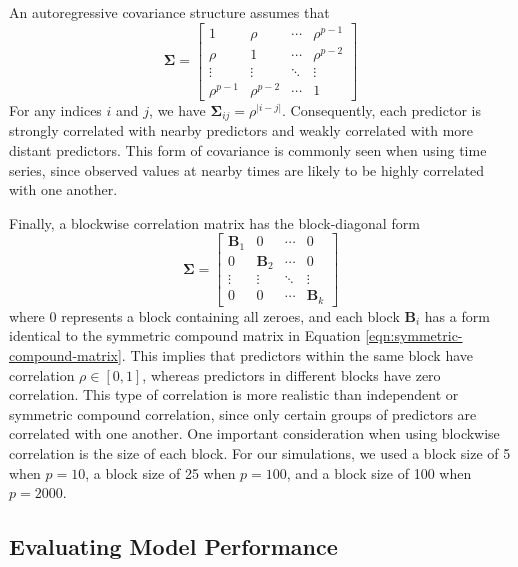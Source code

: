 \documentclass{article}
\begin{document}
	An autoregressive covariance structure assumes that
	\begin{equation}
		\mathbf{\Sigma} = \begin{bmatrix}
			1 & \rho & \cdots & \rho^{p - 1} \\
			\rho & 1 & \cdots & \rho^{p - 2} \\
			\vdots & \vdots & \ddots & \vdots \\
			\rho^{p - 1} & \rho^{p - 2} & \cdots & 1
		\end{bmatrix}
	\end{equation}
	For any indices $i$ and $j$, we have $\mathbf{\Sigma}_{ij} = \rho^{\vert i - j\vert}$. Consequently, each predictor is strongly correlated with nearby predictors and weakly correlated with more distant predictors. This form of covariance is commonly seen when using time series, since observed values at nearby times are likely to be highly correlated with one another. 
	
	Finally, a blockwise correlation matrix has the block-diagonal form
	\begin{equation}
		\mathbf{\Sigma} = \begin{bmatrix}
			\mathbf{B}_1 & 0 & \cdots & 0 \\
			0 & \mathbf{B}_2 & \cdots & 0 \\
			\vdots & \vdots & \ddots & \vdots \\
			0 & 0 & \cdots & \mathbf{B}_k
		\end{bmatrix}
	\end{equation}
	where $0$ represents a block containing all zeroes, and each block $\mathbf{B}_i$ has a form identical to the symmetric compound matrix in Equation \ref{eqn:symmetric-compound-matrix}. This implies that predictors within the same block have correlation $\rho\in [0, 1]$, whereas predictors in different blocks have zero correlation. This type of correlation is more realistic than independent or symmetric compound correlation, since only certain groups of predictors are correlated with one another. One important consideration when using blockwise correlation is the size of each block. For our simulations, we used a block size of 5 when $p = 10$, a block size of 25 when $p = 100$, and a block size of 100 when $p = 2000$.
	
	\subsection{Evaluating Model Performance}\label{sec:evaluating-model-performance}
	
\end{document}
